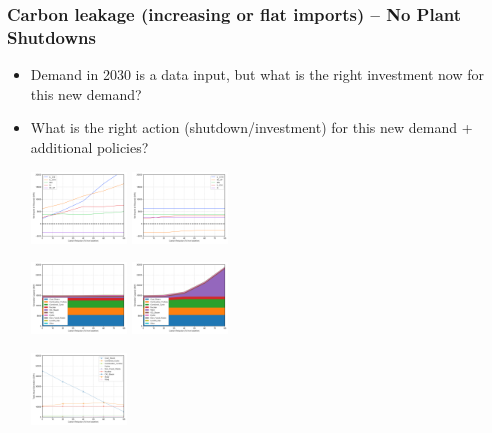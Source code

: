 \documentclass[xcolor=dvipsnames]{beamer}
\begin{document}
\begin{frame}
  \frametitle{Carbon leakage (increasing or flat imports) -- No Plant Shutdowns}

\begin{itemize}
  \item Demand in 2030 is a data input, but what is the right investment now for this new demand?
  \item What is the right action (shutdown/investment) for this new demand + additional policies?


  \includegraphics[width=0.2\textwidth]{includes/leakage_no_shutdowns_agg_exim.png}
  \includegraphics[width=0.2\textwidth]{includes/no_leakage_no_shutdowns_agg_exim.png}

  \includegraphics[width=0.2\textwidth]{includes/leakage_no_shutdowns_agg_capacity_cntlreg.png}
  \includegraphics[width=0.2\textwidth]{includes/no_leakage_no_shutdowns_agg_capacity_cntlreg.png}

  \includegraphics[width=0.2\textwidth]{includes/leakage_no_shutdowns_agg_generation_cntlreg.png}


\end{itemize}
\end{frame}
\end{document}

